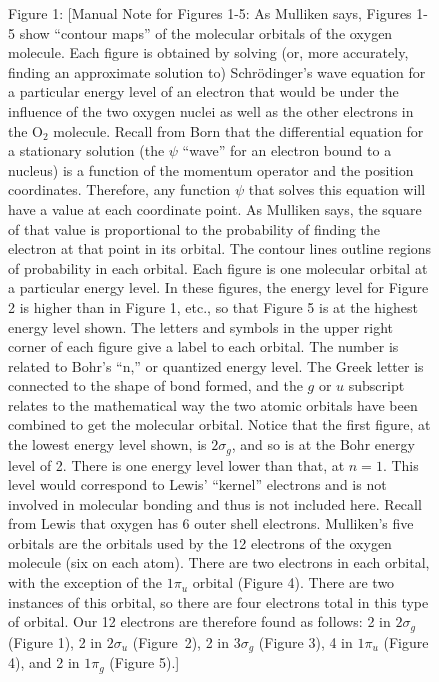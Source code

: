 \documentclass[11pt]{memoir}
\begin{document}
\begin{figure}
\caption*{Figure 1: [Manual Note for Figures 1-5: As Mulliken says, Figures 1-5 show ``contour maps'' of the molecular orbitals of the oxygen molecule.  Each figure is obtained by solving (or, more accurately, finding an approximate solution to) Schr\"{o}dinger's wave equation for a particular energy level of an electron that would be under the influence of the two oxygen nuclei as well as the other electrons in the $\mathrm{O_2}$ molecule.  Recall from Born that the differential equation for a stationary solution (the $\psi$ ``wave'' for an electron bound to a nucleus) is a function of the momentum operator and the position coordinates.  Therefore, any function $\psi$ that solves this equation will have a value at each coordinate point.  As Mulliken says, the square of that value is proportional to the probability of finding the electron at that point in its orbital.  The contour lines outline regions of probability in each orbital. \vspace{3pt}
\newline  Each figure is one molecular orbital at a particular energy level.  In these figures, the energy level for Figure 2 is higher than in Figure 1, etc., so that Figure 5 is at the highest energy level shown.  The letters and symbols in the upper right corner of each figure give a label to each orbital.  The number is related to Bohr's ``n,'' or quantized energy level.  The Greek letter is connected to the shape of bond formed, and the $g$ or $u$ subscript relates to the mathematical way the two atomic orbitals have been combined to get the molecular orbital.  Notice that the first figure, at the lowest energy level shown, is $2\sigma_g$, and so is at the Bohr energy level of 2.  There is one energy level lower than that, at $n=1$.  This level would correspond to Lewis' ``kernel'' electrons and is not involved in molecular bonding and thus is not included here. \vspace{3pt} 
\newline  Recall from Lewis that oxygen has 6 outer shell electrons.  Mulliken's five orbitals are the orbitals used by the 12 electrons of the oxygen molecule (six on each atom).  There are two electrons in each orbital, with the exception of the $1\pi_u$ orbital (Figure 4).  There are two instances of this orbital, so there are four electrons total in this type of orbital.  Our 12 electrons are therefore found as follows: 2 in $2\sigma_g$ (Figure 1), 2 in $2\sigma_u$ (Figure~2), 2 in $3\sigma_g$ (Figure 3), 4 in $1\pi_u$ (Figure 4), and 2 in $1\pi_g$ (Figure 5).]} 

\end{figure}
\end{document}
